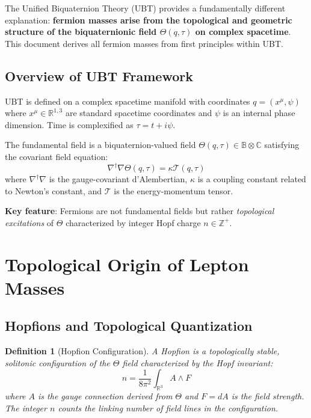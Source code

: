 \documentclass[12pt,a4paper]{article}
\newtheorem{definition}{Definition}[section]
\begin{document}
The Unified Biquaternion Theory (UBT) provides a fundamentally different explanation: \textbf{fermion masses arise from the topological and geometric structure of the biquaternionic field $\Theta(q,\tau)$ on complex spacetime}. This document derives all fermion masses from first principles within UBT.

\subsection{Overview of UBT Framework}

UBT is defined on a complex spacetime manifold with coordinates $q = (x^\mu, \psi)$ where $x^\mu \in \mathbb{R}^{1,3}$ are standard spacetime coordinates and $\psi$ is an internal phase dimension. Time is complexified as $\tau = t + i\psi$.

The fundamental field is a biquaternion-valued field $\Theta(q,\tau) \in \mathbb{B} \otimes \mathbb{C}$ satisfying the covariant field equation:
\begin{equation}
    \nabla^\dagger \nabla \Theta(q,\tau) = \kappa \mathcal{T}(q,\tau)
\end{equation}
where $\nabla^\dagger \nabla$ is the gauge-covariant d'Alembertian, $\kappa$ is a coupling constant related to Newton's constant, and $\mathcal{T}$ is the energy-momentum tensor.

\textbf{Key feature}: Fermions are not fundamental fields but rather \textit{topological excitations} of $\Theta$ characterized by integer Hopf charge $n \in \mathbb{Z}^+$.

\section{Topological Origin of Lepton Masses}

\subsection{Hopfions and Topological Quantization}

\begin{definition}[Hopfion Configuration]
A Hopfion is a topologically stable, solitonic configuration of the $\Theta$ field characterized by the Hopf invariant:
\begin{equation}
    n = \frac{1}{8\pi^2} \int_{\mathbb{R}^3} A \wedge F
\end{equation}
where $A$ is the gauge connection derived from $\Theta$ and $F = dA$ is the field strength. The integer $n$ counts the linking number of field lines in the configuration.
\end{definition}
\end{document}
